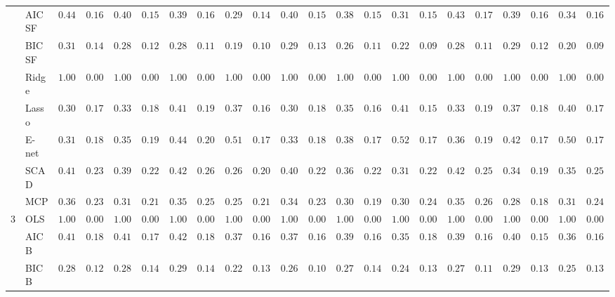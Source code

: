 \begin{tabular}{ll|ll|llllll|llllll|llllll}
 & AIC SF  & $0.4433$ & $0.1679$ & $0.4067$ & $0.1559$ & $0.3967$ & $0.1671$ & $0.2900$ & $0.1472$ & $0.4083$ & $0.1596$ & $0.3867$ & $0.1569$ & $0.3150$ & $0.1551$ & $0.4317$ & $0.1726$ & $0.3950$ & $0.1601$ & $0.3417$ & $0.1648$ \\
 & BIC SF  & $0.3117$ & $0.1434$ & $0.2800$ & $0.1273$ & $0.2850$ & $0.1191$ & $0.1983$ & $0.1078$ & $0.2900$ & $0.1374$ & $0.2683$ & $0.1182$ & $0.2267$ & $0.0933$ & $0.2833$ & $0.1124$ & $0.2900$ & $0.1267$ & $0.2067$ & $0.0951$ \\
 & Ridge  & $1.0000$ & $0.0000$ & $1.0000$ & $0.0000$ & $1.0000$ & $0.0000$ & $1.0000$ & $0.0000$ & $1.0000$ & $0.0000$ & $1.0000$ & $0.0000$ & $1.0000$ & $0.0000$ & $1.0000$ & $0.0000$ & $1.0000$ & $0.0000$ & $1.0000$ & $0.0000$ \\
 & Lasso  & $0.3033$ & $0.1779$ & $0.3317$ & $0.1858$ & $0.4100$ & $0.1945$ & $0.3767$ & $0.1652$ & $0.3033$ & $0.1825$ & $0.3583$ & $0.1648$ & $0.4150$ & $0.1580$ & $0.3367$ & $0.1953$ & $0.3733$ & $0.1897$ & $0.4000$ & $0.1708$ \\
 & E-net  & $0.3150$ & $0.1849$ & $0.3550$ & $0.1919$ & $0.4450$ & $0.2025$ & $0.5117$ & $0.1777$ & $0.3333$ & $0.1895$ & $0.3883$ & $0.1725$ & $0.5233$ & $0.1725$ & $0.3600$ & $0.1978$ & $0.4233$ & $0.1795$ & $0.5000$ & $0.1725$ \\
 & SCAD  & $0.4100$ & $0.2362$ & $0.3983$ & $0.2208$ & $0.4267$ & $0.2620$ & $0.2617$ & $0.2014$ & $0.4033$ & $0.2250$ & $0.3667$ & $0.2235$ & $0.3133$ & $0.2226$ & $0.4250$ & $0.2599$ & $0.3483$ & $0.1955$ & $0.3533$ & $0.2532$ \\
 & MCP  & $0.3667$ & $0.2333$ & $0.3133$ & $0.2109$ & $0.3567$ & $0.2563$ & $0.2517$ & $0.2125$ & $0.3400$ & $0.2308$ & $0.3067$ & $0.1964$ & $0.3083$ & $0.2420$ & $0.3567$ & $0.2649$ & $0.2867$ & $0.1881$ & $0.3150$ & $0.2438$ \\\hline
3 & OLS  & $1.0000$ & $0.0000$ & $1.0000$ & $0.0000$ & $1.0000$ & $0.0000$ & $1.0000$ & $0.0000$ & $1.0000$ & $0.0000$ & $1.0000$ & $0.0000$ & $1.0000$ & $0.0000$ & $1.0000$ & $0.0000$ & $1.0000$ & $0.0000$ & $1.0000$ & $0.0000$ \\
 & AIC B  & $0.4150$ & $0.1873$ & $0.4100$ & $0.1748$ & $0.4267$ & $0.1825$ & $0.3750$ & $0.1698$ & $0.3750$ & $0.1665$ & $0.3950$ & $0.1652$ & $0.3517$ & $0.1879$ & $0.3917$ & $0.1681$ & $0.4050$ & $0.1540$ & $0.3650$ & $0.1653$ \\
 & BIC B  & $0.2800$ & $0.1273$ & $0.2833$ & $0.1489$ & $0.2967$ & $0.1433$ & $0.2283$ & $0.1312$ & $0.2600$ & $0.1068$ & $0.2750$ & $0.1429$ & $0.2417$ & $0.1348$ & $0.2767$ & $0.1190$ & $0.2967$ & $0.1331$ & $0.2550$ & $0.1350$ \\

\end{tabular}
